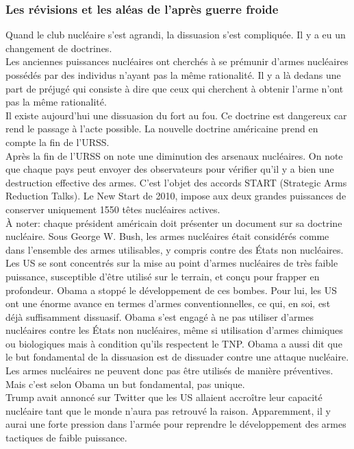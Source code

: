 \documentclass[10pt, a4paper, openany]{book}
\begin{document}
\subsubsection{Les révisions et les aléas de l'après guerre froide}

Quand le club nucléaire s'est agrandi, la dissuasion s'est compliquée. Il y a eu un changement de doctrines. \\
Les anciennes puissances nucléaires ont cherchés à se prémunir d'armes nucléaires possédés par des individus n'ayant pas la même rationalité. Il y a là dedans une part de préjugé qui consiste à dire que ceux qui cherchent à obtenir l'arme n'ont pas la même rationalité. \\
Il existe aujourd'hui une dissuasion du fort au fou. Ce doctrine est dangereux car rend le passage à l'acte possible. La nouvelle doctrine américaine prend en compte la fin de l'URSS. \\
Après la fin de l'URSS on note une diminution des arsenaux nucléaires. On note que chaque pays peut envoyer des observateurs pour vérifier qu'il y a bien une destruction effective des armes. C'est l'objet des accords START (Strategic Arms Reduction Talks). Le New Start de 2010, impose aux deux grandes puissances de conserver uniquement 1550 têtes nucléaires actives. \\
À noter: chaque président américain doit présenter un document sur sa doctrine nucléaire. Sous George W. Bush, les armes nucléaires était considérés comme dans l'ensemble des armes utilisables, y compris contre des États non nucléaires. Les US se sont concentrés sur la mise au point d'armes nucléaires de très faible puissance, susceptible d'être utilisé sur le terrain, et conçu pour frapper en profondeur. Obama a stoppé le développement de ces bombes. Pour lui, les US ont une énorme avance en termes d'armes conventionnelles, ce qui, en soi, est déjà suffisamment dissuasif. Obama s'est engagé à ne pas utiliser d'armes nucléaires contre les États non nucléaires, même si utilisation d'armes chimiques ou biologiques mais à condition qu'ils respectent le TNP. Obama a aussi dit que le but fondamental de la dissuasion est de dissuader contre une attaque nucléaire. Les armes nucléaires ne peuvent donc pas être utilisés de manière préventives. Mais c'est selon Obama un but fondamental, pas unique. \\
Trump avait annoncé sur Twitter que les US allaient accroître leur capacité nucléaire tant que le monde n'aura pas retrouvé la raison. Apparemment, il y aurai une forte pression dans l'armée pour reprendre le développement des armes tactiques de faible puissance.
\end{document}
